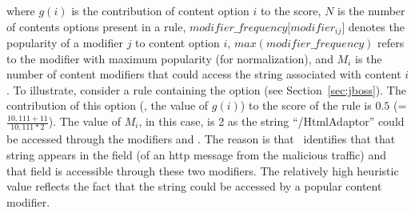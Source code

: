 \documentclass[conference]{IEEEtran}
\begin{document}
\noindent
where $g(i)$ is the contribution of content option $i$ to the score,
$N$ is the number of contents options present in a rule,
$\mathit{modifier\_frequency[modifier_{ij}}]$ denotes the popularity
of a modifier $j$ to content option $i$,
$\mathit{max(modifier\_frequency)}$ refers to the modifier with
maximum popularity (for normalization), and $M_i$ is the number of
content modifiers that could access the string associated with content
$i$.
To illustrate, consider a rule containing the option
 (see Section~\ref{sec:jboss}). The
contribution of this option (\ie{}, the value of $\mathit{g(i)}$) to
the score of the rule is $0.5$ (=$\frac{10,111+11}{10,111*2}$). The
value of $M_i$, in this case, is 2 as the string ``/HtmlAdaptor''
could be accessed through the modifiers  and
. The reason is that \tname\ identifies that
that string appears in the field  (of an http
message from the malicious traffic) and that field is accessible
through these two modifiers. The relatively high heuristic value
reflects the fact that the string could be accessed by a popular
content modifier.



\end{document}
